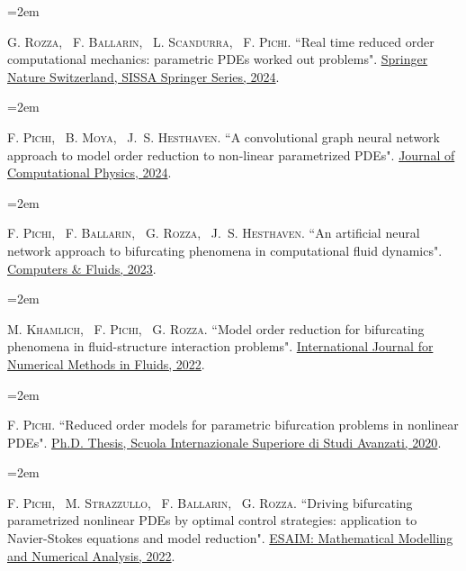\documentclass[
  usegeometry%
]{scrartcl}
\newcommand{\MarginText}[1]{\marginpar{\raggedleft\itshape\small#1}} %
\newcommand{\Description}[1]{\hangindent=2em\hangafter=0\noindent\raggedright\footnotesize{#1}\par\normalsize\vspace{1em}} %
\begin{document}
\begin{cv}{}
\Description{\MarginText{[9]}G. \textsc{Rozza}, ~F. \textsc{Ballarin}, ~L. \textsc{Scandurra}, ~F. \textsc{Pichi.} {\color{blue} ``Real time reduced order computational mechanics: parametric PDEs worked out problems".} \href{https://doi.org/10.1007/978-3-031-49892-3}{Springer Nature Switzerland, SISSA Springer Series, 2024}.}

\Description{\MarginText{[8]}F. \textsc{Pichi}, ~B. \textsc{Moya}, ~J.~S. \textsc{Hesthaven.} {\color{blue} ``A convolutional graph neural network approach to model order reduction to non-linear parametrized PDEs".} \href{https://www.sciencedirect.com/science/article/pii/S0021999124000111}{Journal of Computational Physics, 2024}.}

\Description{\MarginText{[7]}F. \textsc{Pichi}, ~F. \textsc{Ballarin}, ~G. \textsc{Rozza}, ~J.~S. \textsc{Hesthaven.} {\color{blue} ``An artificial neural network approach to bifurcating phenomena in computational fluid dynamics".} \href{https://doi.org/10.1016/j.compfluid.2023.105813}{Computers \& Fluids, 2023}.}


\Description{\MarginText{[6]}M. \textsc{Khamlich}, ~F. \textsc{Pichi}, ~G. \textsc{Rozza.} {\color{blue} ``Model order reduction for bifurcating phenomena in fluid-structure interaction problems".} \href{https://onlinelibrary.wiley.com/doi/abs/10.1002/fld.5118}{International Journal for Numerical Methods in Fluids, 2022}.}


\Description{\MarginText{[5]}F. \textsc{Pichi.} {\color{blue} ``Reduced order models for parametric bifurcation
problems in nonlinear {PDE}s".} \href{https://iris.sissa.it/handle/20.500.11767/114329}{Ph.D. Thesis, Scuola Internazionale Superiore di Studi Avanzati, 2020}.}



\Description{\MarginText{[4]}F. \textsc{Pichi}, ~M. \textsc{Strazzullo}, ~F. \textsc{Ballarin}, ~G. \textsc{Rozza.} {\color{blue} ``Driving bifurcating parametrized nonlinear PDEs by optimal control strategies: application to Navier-Stokes equations and model reduction".} \href{https://www.esaim-m2an.org/articles/m2an/abs/2022/04/m2an200206/m2an200206.html}{ESAIM: Mathematical Modelling and Numerical Analysis, 2022}.}




\end{cv}
\end{document}
